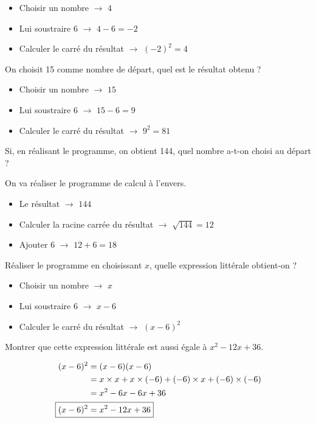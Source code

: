 \documentclass[../Cours.tex]{subfiles}
\begin{document}
\begin{questions}
{\color{rouge}
    \begin{itemize}
        \item Choisir un nombre $\longrightarrow$ $4$
        \item Lui soustraire 6 $\longrightarrow$ $4-6 = -2$
        \item Calculer le carré du résultat $\longrightarrow$ $(-2)^2 = \boxed{4}$
    \end{itemize}
}

\question On choisit 15 comme nombre de départ, quel est le résultat obtenu ?

{\color{rouge}
    \begin{itemize}
        \item Choisir un nombre $\longrightarrow$ $15$
        \item Lui soustraire 6 $\longrightarrow$ $15-6 = 9$
        \item Calculer le carré du résultat $\longrightarrow$ $9^2 = \boxed{81}$
    \end{itemize}
}

\question Si, en réalisant le programme, on obtient 144, quel nombre a-t-on choisi au départ ?

{\color{rouge}
On va réaliser le programme de calcul à l'envers.
    \begin{itemize}
        \item Le résultat $\longrightarrow$ $144$
        \item Calculer la racine carrée du résultat $\longrightarrow$ $\sqrt{144} = 12$
        \item Ajouter 6 $\longrightarrow$ $12+6 = \boxed{18}$
    \end{itemize}
}

\question 
    \subquestion Réaliser le programme en choisissant $x$, quelle expression littérale obtient-on ?

    {\color{rouge}
    \begin{itemize}
        \item Choisir un nombre $\longrightarrow$ $x$
        \item Lui soustraire 6 $\longrightarrow$ $x-6$
        \item Calculer le carré du résultat $\longrightarrow$ $\boxed{(x-6)^2}$
    \end{itemize}
    }
    
    \subquestion Montrer que cette expression littérale est aussi égale à $x^2-12x+36$.

    {\color{rouge}
    \begin{align*}
        (x-6)^2 &= (x-6)(x-6) \\ 
        &= x \times x + x \times (-6) + (-6) \times x + (-6) \times (-6) \\
        &= x^2 - 6x - 6x + 36 \\
        \Aboxed{(x-6)^2 &= x^2 -12x + 36}
    \end{align*}
    }


\end{questions}
\end{document}
